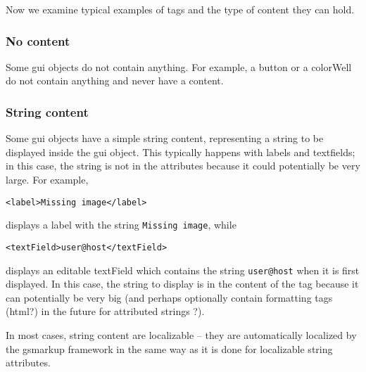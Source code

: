 Now we examine typical examples of tags and the type of content they
can hold.

\subsubsection{No content}
Some gui objects do not contain anything.  For example, a button or a
colorWell do not contain anything and never have a content.

\subsubsection{String content}
Some gui objects have a simple string content, representing a string
to be displayed inside the gui object.  This typically happens with
labels and textfields; in this case, the string is not in the
attributes because it could potentially be very large.  For example,
\begin{verbatim}
<label>Missing image</label>
\end{verbatim}
displays a label with the string \texttt{Missing image}, while
\begin{verbatim}
<textField>user@host</textField>
\end{verbatim}
displays an editable textField which contains the string
\texttt{user@host} when it is first displayed.  In this case, the string 
to display is in the content of the tag because it can potentially be
very big (and perhaps optionally contain formatting tags (html?) in
the future for attributed strings ?).

In most cases, string content are localizable -- they are
automatically localized by the gsmarkup framework in the same way as it is
done for localizable string attributes.

